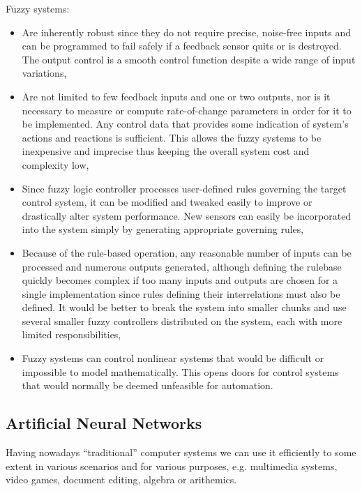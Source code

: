 Fuzzy systems:
\begin{itemize}
\item Are inherently robust since they do not require precise, noise-free inputs and can be programmed to fail safely if a feedback sensor quits or is destroyed. The output control is a smooth control function despite a wide range of input variations,
\item Are not limited to few feedback inputs and one or two outputs, nor is it necessary to measure or compute rate-of-change parameters in order for it to be implemented. Any control data that provides some indication of system's actions and reactions is sufficient. This allows the fuzzy systems to be inexpensive and imprecise thus keeping the overall system cost and complexity low,
\item Since fuzzy logic controller processes user-defined rules governing the target control system, it can be modified and tweaked easily to improve or drastically alter system performance. New sensors can easily be incorporated into the system simply by generating appropriate governing rules,
\item Because of the rule-based operation, any reasonable number of inputs can be processed and numerous outputs generated, although defining the rulebase quickly becomes complex if too many inputs and outputs are chosen for a single implementation since rules defining their interrelations must also be defined. It would be better to break the system into smaller chunks and use several smaller fuzzy controllers distributed on the system, each with more limited responsibilities,
\item Fuzzy systems can control nonlinear systems that would be difficult or impossible to model mathematically. This opens doors for control systems that would normally be deemed unfeasible for automation.
\end{itemize}

\subsection{Artificial Neural Networks}
Having nowadays ``traditional'' computer systems we can use it efficiently to some extent in various scenarios and for various purposes, e.g. multimedia systems, video games, document editing, algebra or arithemics.

